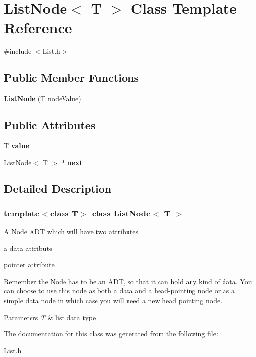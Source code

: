 \hypertarget{class_list_node}{}\section{List\+Node$<$ T $>$ Class Template Reference}
\label{class_list_node}


{\ttfamily \#include $<$List.\+h$>$}

\subsection*{Public Member Functions}
\begin{DoxyCompactItemize}
\item 
\mbox{\label{class_list_node_ab73e442b9e5e6fdd55fd14c7a286e703}} 
{\bfseries List\+Node} (T node\+Value)
\end{DoxyCompactItemize}
\subsection*{Public Attributes}
\begin{DoxyCompactItemize}
\item 
\mbox{\label{class_list_node_a897034a3810748838c5a64524ece0ea0}} 
T {\bfseries value}
\item 
\mbox{\label{class_list_node_a97909c9598053ffd24b77ec715f745f1}} 
\hyperlink{class_list_node}{List\+Node}$<$ T $>$ $\ast$ {\bfseries next}
\end{DoxyCompactItemize}


\subsection{Detailed Description}
\subsubsection*{template$<$class T$>$\newline
class List\+Node$<$ T $>$}

A Node A\+DT which will have two attributes
\begin{DoxyItemize}
\item a data attribute
\item pointer attribute
\end{DoxyItemize}Remember the Node has to be an A\+DT, so that it can hold any kind of data. You can choose to use this node as both a data and a head-\/pointing node or as a simple data node in which case you will need a new head pointing node. 
\begin{DoxyParams}{Parameters}
{\em T} & list data type \\
\hline
\end{DoxyParams}


The documentation for this class was generated from the following file\+:\begin{DoxyCompactItemize}
\item 
List.\+h\end{DoxyCompactItemize}
